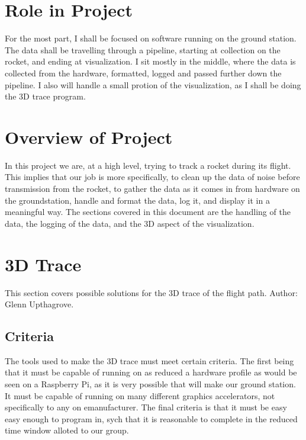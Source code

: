 \documentclass[onecolumn, draftclsnofoot,10pt, compsoc]{IEEEtran}
\begin{document}
\section{Role in Project}
For the most part, I shall be focused on software running on the ground station. The data shall be travelling through a pipeline, starting at collection on the rocket, and ending at visualization. I sit mostly in the middle, where the data is collected from the hardware, formatted, logged and passed further down the pipeline. I also will handle a small protion of the visualization, as I shall be doing the 3D trace program. 
\section{Overview of Project}
In this project we are, at a high level, trying to track a rocket during its flight. This implies that our job is more specifically, to clean up the data of noise before transmission from the rocket, to gather the data as it comes in from hardware on the groundstation, handle and format the data, log it, and display it in a meaningful way. The sections covered in this document are the handling of the data, the logging of the data, and the 3D aspect of the visualization. 
\section{3D Trace}
This section covers possible solutions for the 3D trace of the flight path. Author: Glenn Upthagrove. 
\subsection{Criteria} 
The tools used to make the 3D trace must meet certain criteria. The first being that it must be capable of running on as reduced a hardware profile as would be seen on a Raspberry Pi, as it is very possible that will make our ground station. It must be capable of running on many different graphics accelerators, not specifically to any on emanufacturer. The final criteria is that it must be easy easy enough to program in, sych that it is reasonable to complete in the reduced time window alloted to our group. 
\end{document}
